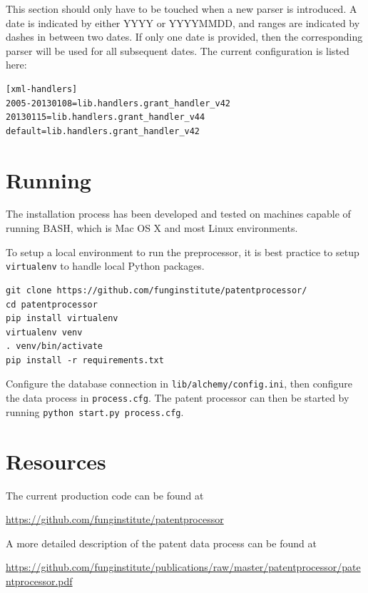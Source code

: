 \documentclass[11pt]{article}
\begin{document}
This section should only have to be touched when a new parser is introduced.  A
date is indicated by either YYYY or YYYYMMDD, and ranges are indicated by
dashes in between two dates. If only one date is provided, then the
corresponding parser will be used for all subsequent dates. The current
configuration is listed here:

\begin{verbatim}
[xml-handlers]
2005-20130108=lib.handlers.grant_handler_v42
20130115=lib.handlers.grant_handler_v44
default=lib.handlers.grant_handler_v42
\end{verbatim}

\section{Running}

The installation process has been developed and tested on machines capable of running BASH, which
is Mac OS X and most Linux environments.

To setup a local environment to run the preprocessor, it is best practice to
setup \verb`virtualenv` to handle local Python packages.

\begin{verbatim}
git clone https://github.com/funginstitute/patentprocessor/
cd patentprocessor
pip install virtualenv
virtualenv venv
. venv/bin/activate
pip install -r requirements.txt
\end{verbatim}

Configure the database connection in \verb`lib/alchemy/config.ini`, then
configure the data process in \verb`process.cfg`. The patent processor can then
be started by running \verb`python start.py process.cfg`.

\section{Resources}

\noindent The current production code can be found at 

\begin{center}\url{https://github.com/funginstitute/patentprocessor}\end{center}

\noindent A more detailed description of the patent data process can be found at 

\begin{center}\url{https://github.com/funginstitute/publications/raw/master/patentprocessor/patentprocessor.pdf}\end{center}
\end{document}
